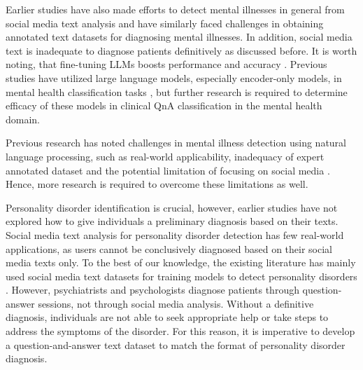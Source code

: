 Earlier studies have also made efforts to detect mental illnesses in general from social media text analysis \cite{dinu2021automatic} \cite{jiang-etal-2020-detection} \cite{yang2024mentallama} \cite{vajre2021psychbert} \cite{xu2024mental} \cite{martinez2022early} and have similarly faced challenges in obtaining annotated text datasets for diagnosing mental illnesses. In addition, social media text is inadequate to diagnose patients definitively as discussed before. It is worth noting, that fine-tuning LLMs boosts performance and accuracy \cite{xu2024mental}. Previous studies have utilized large language models, especially encoder-only models, in mental health classification tasks \cite{jain2024text} \cite{dinu2021automatic} \cite{jiang-etal-2020-detection} \cite{yang2024mentallama} \cite{vajre2021psychbert} \cite{xu2024mental} \cite{martinez2022early} \cite{suicidalideationtransformers2020}, but further research is required to determine efficacy of these models in clinical QnA classification in the mental health domain.

Previous research has noted challenges in mental illness detection using natural language processing, such as real-world applicability, inadequacy of expert annotated dataset and the potential limitation of focusing on social media \cite{montejo2024survey} \cite{zhang2022natural} \cite{ellouze2024artificial} \cite{greco2023transformer}. Hence, more research is required to overcome these limitations as well.

Personality disorder identification is crucial, however, earlier studies have not explored how to give individuals a preliminary diagnosis based on their texts. Social media text analysis for personality disorder detection has few real-world applications, as users cannot be conclusively diagnosed based on their social media texts only.
To the best of our knowledge, the existing literature has mainly used social media text datasets for training models to detect personality disorders \cite{jain2024text} \cite{ellouze2022deep} \cite{singh2020framework} \cite{ellouze2022hybrid}. However, psychiatrists and psychologists diagnose patients through question-answer sessions, not through social media analysis. Without a definitive diagnosis, individuals are not able to seek appropriate help or take steps to address the symptoms of the disorder. For this reason, it is imperative to develop a question-and-answer text dataset to match the format of personality disorder diagnosis. 

